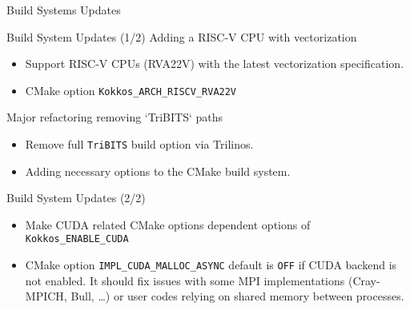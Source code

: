 
\begin{frame}[fragile]

  {\Huge Build Systems Updates}

  \vspace{10pt}

\end{frame}




\begin{frame}[fragile]{Build System Updates (1/2)}
  Adding a RISC-V CPU with vectorization
  \begin{itemize}
      \item Support RISC-V CPUs (RVA22V) with the latest vectorization specification.
      \item CMake option \texttt{Kokkos\_ARCH\_RISCV\_RVA22V}
  \end{itemize}

  Major refactoring removing `TriBITS` paths
  \begin{itemize}
      \item Remove full \texttt{TriBITS} build option via Trilinos.
      \item Adding necessary options to the CMake build system.
  \end{itemize}
\end{frame}

\begin{frame}[fragile]{Build System Updates (2/2)}
  \begin{itemize}
      \item Make CUDA related CMake options dependent options of \texttt{Kokkos\_ENABLE\_CUDA}
      \item CMake option \texttt{IMPL\_CUDA\_MALLOC\_ASYNC} default is \texttt{OFF} if CUDA backend is not enabled.
      It should fix issues with some MPI implementations (Cray-MPICH, Bull, \ldots) or user codes relying on shared memory between processes.
  \end{itemize}
\end{frame}


